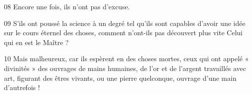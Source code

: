 
08 Encore une fois, ils n’ont pas d’excuse.

09 S’ils ont poussé la science à un degré tel qu’ils sont capables d’avoir une idée sur le cours éternel des choses, comment n’ont-ils pas découvert plus vite Celui qui en est le Maître ?

10 Mais malheureux, car ils espèrent en des choses mortes, ceux qui ont appelé « divinités » des ouvrages de mains humaines, de l’or et de l’argent travaillés avec art, figurant des êtres vivants, ou une pierre quelconque, ouvrage d’une main d’autrefois !